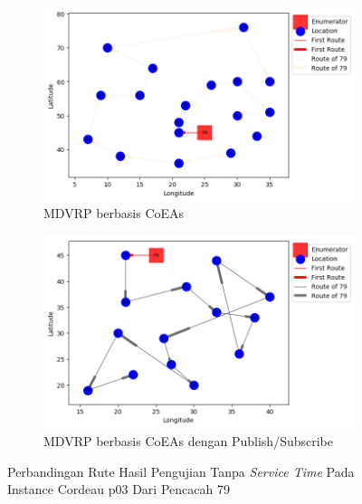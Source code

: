 \begin{figure}[H]
	\centering
	\begin{subfigure}[t]{\textwidth}
		\centering
		\includegraphics[width=\textwidth]{Resources/Images/cordeau_p03/cordeau_p03_notw_79_coes}
		\caption{MDVRP berbasis CoEAs}
		\label{fig:cordeau_p03_notw_79_coes}
	\end{subfigure}
	\begin{subfigure}[t]{\textwidth}
		\centering
		\includegraphics[width=\textwidth]{Resources/Images/cordeau_p03/cordeau_p03_notw_79_pubsub_coes}
		\caption{MDVRP berbasis CoEAs dengan Publish/Subscribe}
		\label{fig:cordeau_p03_notw_79_pubsub_coes}
	\end{subfigure}
	\caption{Perbandingan Rute Hasil Pengujian Tanpa \textit{Service Time} Pada Instance Cordeau p03 Dari Pencacah 79}
	\label{fig:cordeau_p03_notw_79}
\end{figure}


